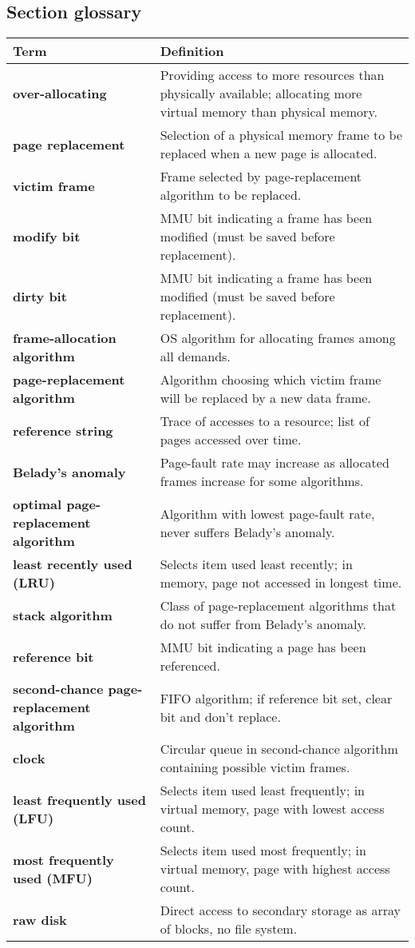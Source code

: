 \subsection*{Section glossary}
\begin{tabular}{p{}p{}}
    \toprule
    \textbf{Term} & \textbf{Definition} \\
    \midrule
    \textbf{over-allocating} & Providing access to more resources than physically available; allocating more virtual memory than physical memory. \\
    \textbf{page replacement} & Selection of a physical memory frame to be replaced when a new page is allocated. \\
    \textbf{victim frame} & Frame selected by page-replacement algorithm to be replaced. \\
    \textbf{modify bit} & MMU bit indicating a frame has been modified (must be saved before replacement). \\
    \textbf{dirty bit} & MMU bit indicating a frame has been modified (must be saved before replacement). \\
    \textbf{frame-allocation algorithm} & OS algorithm for allocating frames among all demands. \\
    \textbf{page-replacement algorithm} & Algorithm choosing which victim frame will be replaced by a new data frame. \\
    \textbf{reference string} & Trace of accesses to a resource; list of pages accessed over time. \\
    \textbf{Belady's anomaly} & Page-fault rate may increase as allocated frames increase for some algorithms. \\
    \textbf{optimal page-replacement algorithm} & Algorithm with lowest page-fault rate, never suffers Belady's anomaly. \\
    \textbf{least recently used (LRU)} & Selects item used least recently; in memory, page not accessed in longest time. \\
    \textbf{stack algorithm} & Class of page-replacement algorithms that do not suffer from Belady's anomaly. \\
    \textbf{reference bit} & MMU bit indicating a page has been referenced. \\
    \textbf{second-chance page-replacement algorithm} & FIFO algorithm; if reference bit set, clear bit and don't replace. \\
    \textbf{clock} & Circular queue in second-chance algorithm containing possible victim frames. \\
    \textbf{least frequently used (LFU)} & Selects item used least frequently; in virtual memory, page with lowest access count. \\
    \textbf{most frequently used (MFU)} & Selects item used most frequently; in virtual memory, page with highest access count. \\
    \textbf{raw disk} & Direct access to secondary storage as array of blocks, no file system. \\
    \bottomrule
\end{tabular}
